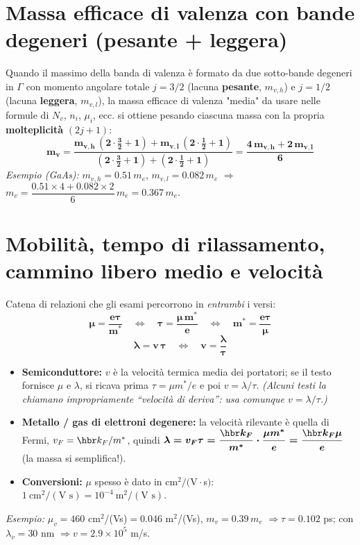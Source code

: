 \section{Massa efficace di valenza con bande degeneri (pesante + leggera)}
Quando il massimo della banda di valenza è formato da due sotto-bande degeneri in $\Gamma$
con momento angolare totale $j=3/2$ (lacuna \textbf{pesante}, $m_{v,h}$) e $j=1/2$
(lacuna \textbf{leggera}, $m_{v,l}$), la massa efficace di valenza "media" da usare
nelle formule di $N_v$, $n_i$, $\mu_i$, ecc. si ottiene pesando ciascuna massa con la
propria \textbf{molteplicità} $(2j+1)$:
\[ \bm{m_v = \frac{m_{v,h}\,(2\cdot\tfrac32+1) + m_{v,l}\,(2\cdot\tfrac12+1)}{(2\cdot\tfrac32+1)+(2\cdot\tfrac12+1)}
        = \frac{4\,m_{v,h} + 2\,m_{v,l}}{6}} \]
\textit{Esempio (GaAs):} $m_{v,h}=0.51\,m_e$, $m_{v,l}=0.082\,m_e$ $\Rightarrow$
$m_v = \dfrac{0.51\times4+0.082\times2}{6}\,m_e = 0.367\,m_e$.

\section{Mobilità, tempo di rilassamento, cammino libero medio e velocità}
Catena di relazioni che gli esami percorrono in \emph{entrambi} i versi:
\[ \bm{\mu = \frac{e\tau}{m^*}} \quad\Longleftrightarrow\quad
   \bm{\tau = \frac{\mu\,m^*}{e}} \quad\Longleftrightarrow\quad
   \bm{m^* = \frac{e\tau}{\mu}} \]
\[ \bm{\lambda = v\,\tau} \quad\Longleftrightarrow\quad \bm{v = \frac{\lambda}{\tau}} \]
\begin{itemize}
  \setlength{\itemsep}{1pt}
  \item \textbf{Semiconduttore:} $v$ è la velocità termica media dei portatori; se il testo
  fornisce $\mu$ e $\lambda$, si ricava prima $\tau=\mu m^*/e$ e poi $v=\lambda/\tau$.
  \textit{(Alcuni testi la chiamano impropriamente ``velocità di deriva'': usa comunque $v=\lambda/\tau$.)}
  \item \textbf{Metallo / gas di elettroni degenere:} la velocità rilevante è quella di Fermi,
$v_F=\hbr k_F/m^*$, quindi $\boldsymbol{\lambda = v_F\tau = \dfrac{\hbr k_F}{m^*}\cdot\dfrac{\mu m^*}{e}
= \dfrac{\hbr k_F \mu}{e}}$ (la massa si semplifica!).
  \item \textbf{Conversioni:} $\mu$ spesso è dato in cm$^2/(\text{V}\cdot$s$)$:
  $1\ \text{cm}^2/(\text{V s}) = 10^{-4}\ \text{m}^2/(\text{V s})$.
\end{itemize}
\textit{Esempio:} $\mu_v=460$ cm$^2$/(Vs)$=0.046$ m$^2$/(Vs), $m_v=0.39\,m_e$
$\Rightarrow \tau=0.102$ ps; con $\lambda_v=30$ nm $\Rightarrow v=2.9\times10^5$ m/s.

